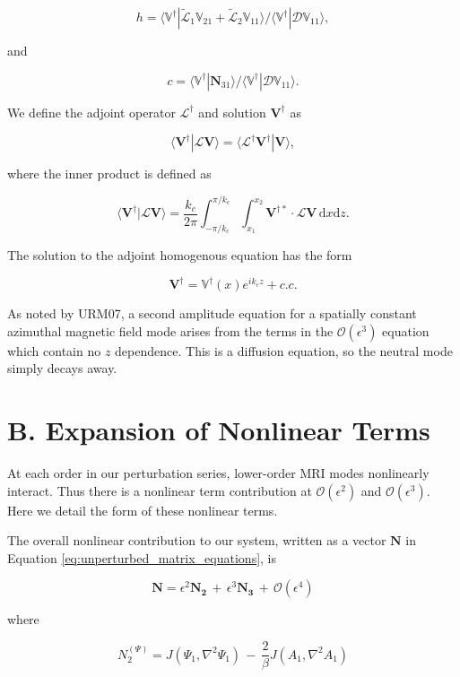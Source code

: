 \documentclass{emulateapj}
\newcommand{\beq}{\begin{equation}}
\newcommand{\eeq}{\end{equation}}
\begin{document}
\beq
h = \langle \mathbb{V}^\dagger | \widetilde{\mathcal{L}}_1 \mathbb{V}_{21} + \widetilde{\mathcal{L}}_2 \mathbb{V}_{11} \rangle / \langle \mathbb{V}^\dagger | \mathcal{D} \mathbb{V}_{11} \rangle,
\eeq

and

\beq
c = \langle \mathbb{V}^\dagger | \mathbf{N}_{31} \rangle / \langle \mathbb{V}^\dagger | \mathcal{D} \mathbb{V}_{11} \rangle. 
\eeq

We define the adjoint operator $\mathcal{L}^\dagger$ and solution $\mathbf{V}^\dagger$ as 

\beq
\langle \mathbf{V^\dagger} | \mathcal{L} \mathbf{V} \rangle = \langle \mathcal{L}^\dagger \mathbf{V}^\dagger | \mathbf{V} \rangle,
\eeq

where the inner product is defined as 

\beq\label{eq:inner_product_def}
\langle \mathbf{V^\dagger} | \mathcal{L} \mathbf{V} \rangle = \frac{k_c}{2\pi} \int_{-\pi/k_c}^{\pi/k_c} \int_{x_1}^{x_2} \mathbf{V}^{\dagger*} \cdot \mathcal{L} \mathbf{V} \, \mathrm{d} x \mathrm{d} z.
\eeq

The solution to the adjoint homogenous equation has the form 

\beq
\mathbf{V^\dagger} = \mathbb{V}^\dagger(x) e^{i k_c z} + c.c.
\eeq

As noted by URM07, a second amplitude equation for a spatially constant azimuthal magnetic field mode arises from the terms in the $\mathcal{O}(\epsilon^3)$ equation which contain no $z$ dependence. This is a diffusion equation, so the neutral mode simply decays away.

\section{B. Expansion of Nonlinear Terms}\label{app:nonlinear_terms}

At each order in our perturbation series, lower-order MRI modes nonlinearly interact. Thus there is a nonlinear term contribution at $\mathcal{O}(\epsilon^2)$ and $\mathcal{O}(\epsilon^3)$. Here we detail the form of these nonlinear terms. 

The overall nonlinear contribution to our system, written as a vector $\mathbf{N}$ in Equation \ref{eq:unperturbed_matrix_equations}, is

\beq
\mathbf{N} = \epsilon^2\mathbf{N_2} \, + \, \epsilon^3\mathbf{N_3} \, + \, \mathcal{O}(\epsilon^4)
\eeq

where

\beq
N_2^{(\Psi)} = J(\Psi_1, \nabla^2 \Psi_1) \,-\, \frac{2}{\beta}J(A_1, \nabla^2 A_1) 
\eeq
\end{document}
